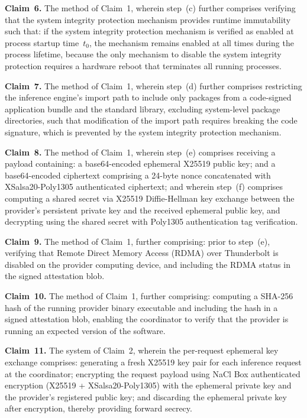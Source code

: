 \documentclass[11pt,letterpaper]{article}
\begin{document}
\textbf{Claim~6.} The method of Claim~1, wherein step~(c) further comprises verifying that the system integrity protection mechanism provides runtime immutability such that: if the system integrity protection mechanism is verified as enabled at process startup time~$t_0$, the mechanism remains enabled at all times during the process lifetime, because the only mechanism to disable the system integrity protection requires a hardware reboot that terminates all running processes.

\textbf{Claim~7.} The method of Claim~1, wherein step~(d) further comprises restricting the inference engine's import path to include only packages from a code-signed application bundle and the standard library, excluding system-level package directories, such that modification of the import path requires breaking the code signature, which is prevented by the system integrity protection mechanism.

\textbf{Claim~8.} The method of Claim~1, wherein step~(e) comprises receiving a payload containing: a base64-encoded ephemeral X25519 public key; and a base64-encoded ciphertext comprising a 24-byte nonce concatenated with XSalsa20-Poly1305 authenticated ciphertext; and wherein step~(f) comprises computing a shared secret via X25519 Diffie-Hellman key exchange between the provider's persistent private key and the received ephemeral public key, and decrypting using the shared secret with Poly1305 authentication tag verification.

\textbf{Claim~9.} The method of Claim~1, further comprising: prior to step~(e), verifying that Remote Direct Memory Access (RDMA) over Thunderbolt is disabled on the provider computing device, and including the RDMA status in the signed attestation blob.

\textbf{Claim~10.} The method of Claim~1, further comprising: computing a SHA-256 hash of the running provider binary executable and including the hash in a signed attestation blob, enabling the coordinator to verify that the provider is running an expected version of the software.

\textbf{Claim~11.} The system of Claim~2, wherein the per-request ephemeral key exchange comprises: generating a fresh X25519 key pair for each inference request at the coordinator; encrypting the request payload using NaCl Box authenticated encryption (X25519 + XSalsa20-Poly1305) with the ephemeral private key and the provider's registered public key; and discarding the ephemeral private key after encryption, thereby providing forward secrecy.
\end{document}
